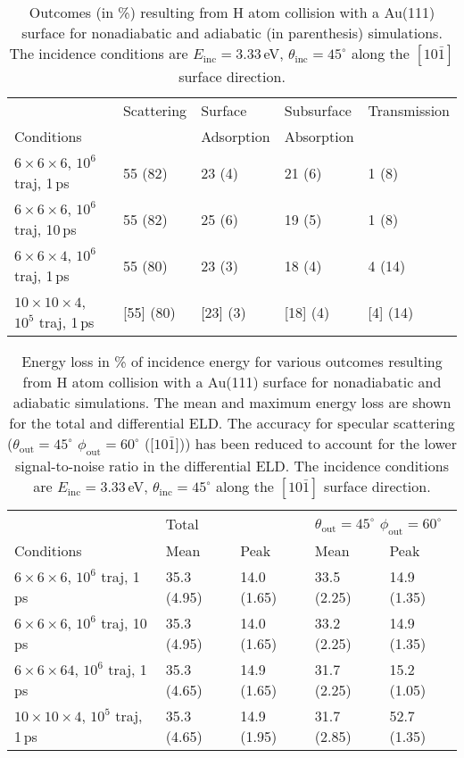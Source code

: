 \documentclass[twoside, 11pt, titlepage, captions=nooneline, a4paper, headsepline]{scrbook}%
\begin{document}
\begin{table}[t!]
\centering
\caption{\label{Tab:Res:MD:Stat:scattering}Outcomes (in \%) resulting from H atom collision with a Au(111) surface for nonadiabatic and adiabatic (in parenthesis) simulations. The incidence conditions are $E_\mathrm{inc}=3.33$\,eV, $\theta_\mathrm{inc}=45^\circ$ along the $[10\bar{1}]$ surface direction.}
\begin{tabular}{lllll}
\hline\hline
&Scattering&Surface&Subsurface&Transmission\\
Conditions &  & Adsorption&Absorption &  \\ \hline
$6\times6\times6$, $10^6$ traj, 1\,ps &55 (82)&23 (4)&21 (6)&1 (8)\\
$6\times6\times6$, $10^6$ traj, 10\,ps&55 (82)&25 (6)	&19 (5)	&1 (8)\\
$6\times 6\times4$, $10^6$ traj, 1\,ps&55 (80)&23 (3)&18 (4)&4 (14)\\
$10\times 10\times4$, $10^5$ traj, 1\,ps&[55] (80)&[23] (3)&[18] (4)&[4] (14)\\
\hline
\end{tabular}
\end{table}

\begin{table}[t!]
\centering
\caption{\label{Tab:Res:MD:Stat:eloss}Energy loss in \% of incidence energy for various outcomes resulting from H atom collision with a Au(111) surface for nonadiabatic and adiabatic simulations. The mean and maximum energy loss are shown for the total and differential ELD. The accuracy for specular scattering ($\theta_\mathrm{out} = 45^\circ$ $\phi_\mathrm{out} = 60^\circ$ ([$10\bar{1}]$)) has been reduced to account for the lower signal-to-noise ratio in the differential ELD. The incidence conditions are $E_\mathrm{inc}=3.33$\,eV, $\theta_\mathrm{inc}=45^\circ$ along the $[10\bar{1}]$ surface direction.}
\begin{tabular}{lllll}
\hline\hline
&\multicolumn{2}{l}{Total}&\multicolumn{2}{l}{$\theta_\mathrm{out} = 45^\circ$ $\phi_\mathrm{out} = 60^\circ$}\\
Conditions & Mean & Peak& Mean & Peak \\ \hline
$6\times6\times6$, $10^6$ traj, 1\,ps &35.3 (4.95)&14.0 (1.65)&33.5 (2.25)&14.9 (1.35)\\

$6\times6\times6$, $10^6$ traj, 10\,ps	&35.3 (4.95)&14.0 (1.65)&33.2 (2.25)&14.9 (1.35)\\

$6\times6\times64$, $10^6$ traj, 1\,ps&35.3 (4.65)&14.9 (1.65)&31.7 (2.25)&15.2 (1.05)\\

$10\times 10\times4$, $10^5$ traj, 1\,ps&35.3 (4.65)& 14.9 (1.95)&31.7 (2.85)&52.7 (1.35)\\
\hline
\hline
\end{tabular}
\end{table}
\end{document}
